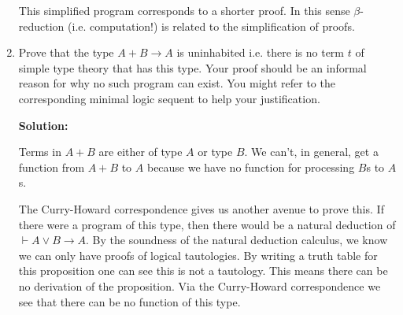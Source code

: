 \documentclass[11pt]{report}
\begin{document}
\begin{enumerate}
		This simplified program corresponds to a shorter proof. In this sense $\beta$-reduction (i.e. computation!) is related to the simplification of proofs.  

	\newpage
	\item Prove that the type $A + B \to A$ is uninhabited i.e. there is no term $t$ of simple type theory that has this type. Your proof should be an informal reason for why no such program can exist. You might refer to the corresponding minimal logic sequent to help your justification.
	
	{\bf Solution:}
	
	Terms in $A + B$ are either of type $A$ or type $B$. We can't, in general, get a function from $A + B$ to $A$ because we have no function for processing $B$s to $A$s. 
	
	The Curry-Howard correspondence gives us another avenue to prove this. If there were a program of this type, then there would be a natural deduction of $\vdash A \lor B \to A$. By the soundness of the natural deduction calculus, we know we can only have proofs of logical tautologies. By writing a truth table for this proposition one can see this is not a tautology. This means there can be no derivation of the proposition. Via the Curry-Howard correspondence we see that there can be no function of this type.

	 
\end{enumerate}
	
\end{document}
